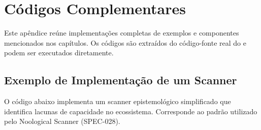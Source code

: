 \chapter{Códigos Complementares}
\label{apend:codigos}

Este apêndice reúne implementações completas de exemplos e componentes
mencionados nos capítulos. Os códigos são extraídos do código-fonte real
do \opencodeeco{} e podem ser executados diretamente.

\section{Exemplo de Implementação de um Scanner}
\label{sec:cod-scanner}

O código abaixo implementa um scanner epistemológico simplificado que
identifica lacunas de capacidade no ecossistema. Corresponde ao padrão
utilizado pelo Noological Scanner (SPEC-028).

